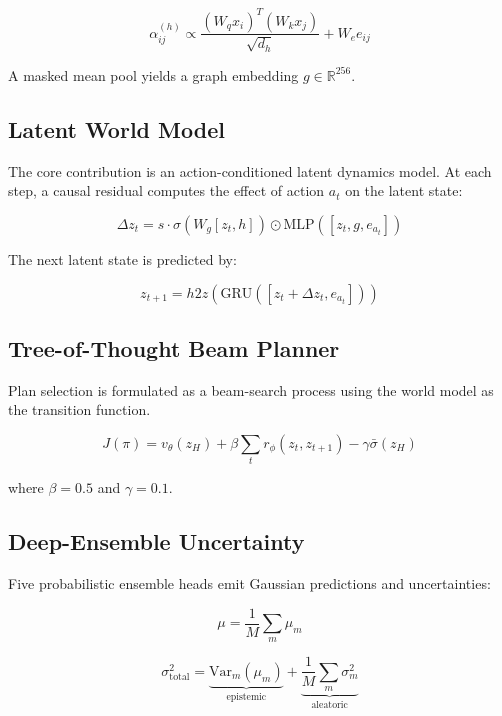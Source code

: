 \begin{equation}
\alpha_{ij}^{(h)}
\propto
\frac{
(W_qx_i)^T(W_kx_j)
}
{\sqrt{d_h}}
+
W_e e_{ij}
\end{equation}

A masked mean pool yields a graph embedding $g\in\mathbb{R}^{256}$.

\subsection{Latent World Model}

The core contribution is an action-conditioned latent dynamics model. At each step, a causal residual computes the effect of action $a_t$ on the latent state:

\begin{equation}
\Delta z_t
=
s\cdot
\sigma
\left(
W_g[z_t,h]
\right)
\odot
\mathrm{MLP}
\left(
[z_t,g,e_{a_t}]
\right)
\end{equation}

The next latent state is predicted by:

\begin{equation}
z_{t+1}
=
h2z
\left(
\mathrm{GRU}
\left(
[z_t+\Delta z_t,e_{a_t}]
\right)
\right)
\end{equation}

\subsection{Tree-of-Thought Beam Planner}

Plan selection is formulated as a beam-search process using the world model as the transition function.

\begin{equation}
J(\pi)
=
v_{\theta}(z_H)
+
\beta
\sum_t
r_{\phi}(z_t,z_{t+1})
-
\gamma
\bar{\sigma}(z_H)
\end{equation}

where $\beta=0.5$ and $\gamma=0.1$.

\subsection{Deep-Ensemble Uncertainty}

Five probabilistic ensemble heads emit Gaussian predictions and uncertainties:

\begin{equation}
\mu
=
\frac{1}{M}
\sum_m \mu_m
\end{equation}

\begin{equation}
\sigma^2_{\text{total}}
=
\underbrace{\mathrm{Var}_m(\mu_m)}_{\text{epistemic}}
+
\underbrace{
\frac{1}{M}
\sum_m \sigma_m^2
}_{\text{aleatoric}}
\end{equation}

